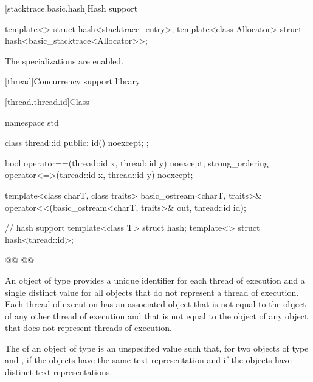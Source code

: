 \documentclass{wg21}
\begin{document}
[stacktrace.basic.hash]{Hash support}

\begin{itemdecl}
    template<> struct hash<stacktrace_entry>;
    template<class Allocator> struct hash<basic_stacktrace<Allocator>>;
\end{itemdecl}

\begin{itemdescr}
    \pnum
    The specializations are enabled.
\end{itemdescr}

[thread]{Concurrency support library}

[thread.thread.id]{Class }

%
%
\begin{codeblock}
    namespace std {
        class thread::id {
            public:
            id() noexcept;
        };

        bool operator==(thread::id x, thread::id y) noexcept;
        strong_ordering operator<=>(thread::id x, thread::id y) noexcept;

        template<class charT, class traits>
        basic_ostream<charT, traits>&
        operator<<(basic_ostream<charT, traits>& out, thread::id id);

        // hash support
        template<class T> struct hash;
        template<> struct hash<thread::id>;

        @@
        @@
    }
\end{codeblock}

\pnum
An object of type  provides a unique identifier for
each thread of execution and a single distinct value for all 
objects that do not represent a thread of
execution. Each thread of execution has an
associated  object that is not equal to the
 object of any other thread of execution and that is not
equal to the  object of any  object that
does not represent threads of execution.

\begin{addedblock}
The  of an object of type 
is an unspecified value such that, for two objects of type   and ,
if  the  objects have the same text
representation and if  the  objects have
distinct text representations.
\end{addedblock}
\end{document}
